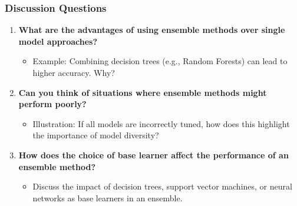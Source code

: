 \documentclass[aspectratio=169]{beamer}
\begin{document}
\begin{frame}[fragile]
    \frametitle{Discussion Questions}
    \begin{enumerate}
        \item \textbf{What are the advantages of using ensemble methods over single model approaches?}
        \begin{itemize}
            \item Example: Combining decision trees (e.g., Random Forests) can lead to higher accuracy. Why?
        \end{itemize}
        
        \item \textbf{Can you think of situations where ensemble methods might perform poorly?}
        \begin{itemize}
            \item Illustration: If all models are incorrectly tuned, how does this highlight the importance of model diversity?
        \end{itemize}
        
        \item \textbf{How does the choice of base learner affect the performance of an ensemble method?}
        \begin{itemize}
            \item Discuss the impact of decision trees, support vector machines, or neural networks as base learners in an ensemble.
        \end{itemize}
    \end{enumerate}
\end{frame}
\end{document}
